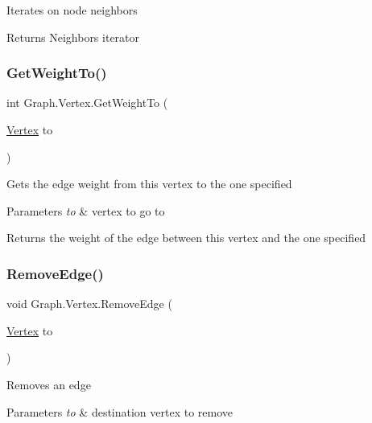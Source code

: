 Iterates on node neighbors 

\begin{DoxyReturn}{Returns}
Neighbors iterator
\end{DoxyReturn}
\mbox{\label{class_graph_1_1_vertex_aa96f873cf862f818c345a5d97c3b62c1}} 
\subsubsection{\texorpdfstring{Get\+Weight\+To()}{GetWeightTo()}}
{\footnotesize\ttfamily int Graph.\+Vertex.\+Get\+Weight\+To (\begin{DoxyParamCaption}\item[{\hyperlink{class_graph_1_1_vertex}{Vertex}}]{to }\end{DoxyParamCaption})}



Gets the edge weight from this vertex to the one specified 


\begin{DoxyParams}{Parameters}
{\em to} & vertex to go to\\
\hline
\end{DoxyParams}
\begin{DoxyReturn}{Returns}
the weight of the edge between this vertex and the one specified
\end{DoxyReturn}
\mbox{\label{class_graph_1_1_vertex_a634f39ee548903000dd1b8c702351fe8}} 
\subsubsection{\texorpdfstring{Remove\+Edge()}{RemoveEdge()}}
{\footnotesize\ttfamily void Graph.\+Vertex.\+Remove\+Edge (\begin{DoxyParamCaption}\item[{\hyperlink{class_graph_1_1_vertex}{Vertex}}]{to }\end{DoxyParamCaption})}



Removes an edge 


\begin{DoxyParams}{Parameters}
{\em to} & destination vertex to remove\\
\hline
\end{DoxyParams}
\mbox{\label{class_graph_1_1_vertex_a235f3019b6b480a8bf4c8116a5d30bf4}} 
